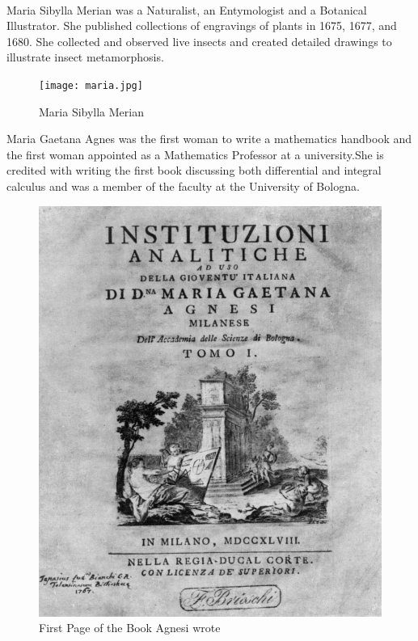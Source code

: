 \documentclass[a4paper,10pt]{article}
\begin{document}
\newblock
\\
Maria Sibylla Merian was a Naturalist, an Entymologist and a Botanical Illustrator. She published collections of engravings of plants in 1675, 1677, and 1680. She collected and observed live insects and created detailed drawings to illustrate insect metamorphosis.\cite{merian}


\begin{center}
\begin{figure}[h]
\centering
 \texttt{[image: maria.jpg]}
 \caption{Maria Sibylla Merian}
\end{figure}
\end{center}


\newblock
Maria Gaetana Agnes was the first woman to write a mathematics handbook and the first woman appointed as a Mathematics Professor at a university.She is credited with writing the first book discussing both differential and integral calculus and was a member of the faculty at the University of Bologna\cite{agnesi}.

\begin{center}
\begin{figure}[h]
\centering
 \includegraphics[scale=0.9]{agnesi.png}
 \caption{First Page of the Book Agnesi wrote}
\end{figure}
\end{center}
\end{document}
